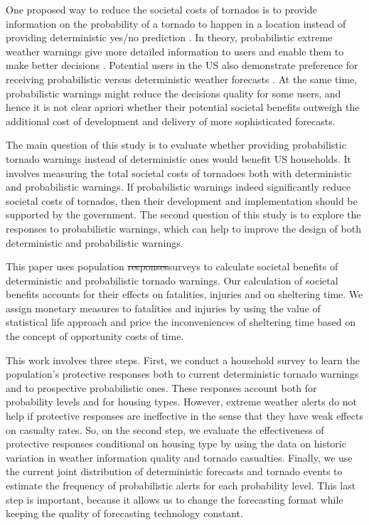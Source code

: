 \documentclass{ametsocV6.1}
\newcommand{\add}[1]{{\color{red}#1}}
\begin{document}
One proposed way to reduce the societal costs of tornados is to provide information on the probability of a tornado to happen in a location instead of providing deterministic yes/no prediction \citep{rothfusz_facets_2018}. In theory, probabilistic extreme weather warnings give more detailed information to users and enable them to make better decisions \citep{murphy_what_1993, papastavrou_improving_1996}.  Potential users in the US also demonstrate preference for receiving probabilistic versus deterministic weather forecasts \citep*{morss_communicating_2008, morss_examining_2010}. At the same time, probabilistic warnings might reduce the decisions quality for some users, and hence it is not clear apriori whether their potential societal benefits outweigh the additional cost of development and delivery of more sophisticated forecasts.

\add{The main question of this study is to evaluate whether providing probabilistic tornado warnings instead of deterministic ones would benefit US households. It involves measuring the total societal costs of tornadoes both with deterministic and probabilistic warnings. If probabilistic warnings indeed significantly reduce societal costs of tornados, then their development and implementation should be supported by the government. The second question of this study is to explore the responses to probabilistic warnings, which can help to improve the design of both deterministic and probabilistic warnings.}

This paper uses population \sout{responses}\add{surveys} to calculate societal benefits of deterministic and probabilistic tornado warnings. Our calculation of societal benefits accounts for their effects on fatalities, injuries and on sheltering time. We assign monetary measures to fatalities and injuries by using the value of statistical life approach and price the inconveniences of sheltering time based on the concept of opportunity costs of time.

This work involves three steps. First, we conduct a household survey to learn the population's protective responses both to current deterministic tornado warnings and to prospective probabilistic ones. These responses account both for probability levels and for housing types. However, extreme weather alerts do not help if protective responses are ineffective in the sense that they have weak effects on casualty rates. So, on the second step, we evaluate the effectiveness of protective responses conditional on housing type by using the data on historic variation in weather information quality and tornado casualties. Finally, we use the current joint distribution of deterministic forecasts and tornado events to estimate the frequency of probabilistic alerts for each probability level. This last step is important, because it allows us to change the forecasting format while keeping the quality of forecasting technology constant.
\end{document}
